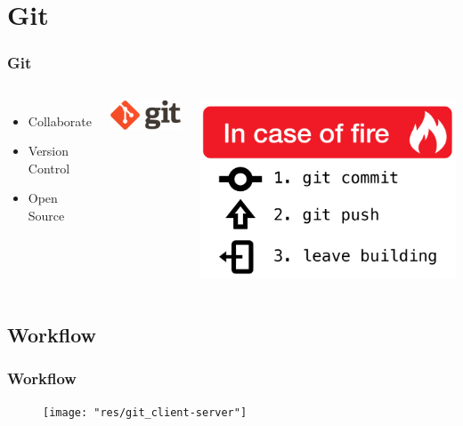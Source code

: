 
    
    \section{Git}
	\begin{frame}
		\frametitle{Git}
		\begin{columns}[c]
        		\begin{itemize}
					\item Collaborate
                    \item Version Control
                    \item Open Source
          		\end{itemize}
            	\centering
				\includegraphics[width=.7\linewidth,]{res/git}

				\vspace{1cm} %

				\includegraphics[width=.7\linewidth]{res/fire}
        \end{columns}
	\end{frame}
    
    \subsection{Workflow}
    \begin{frame}[allowframebreaks=10] %
		\frametitle{Workflow}
        \begin{figure}
        	\centering
        	\texttt{[image: "res/git\_client-server"]} \\
        \end{figure}
	\end{frame}
    
